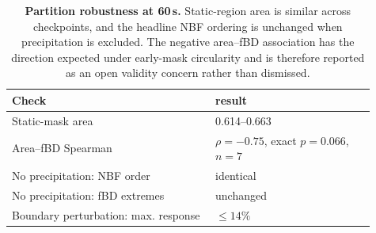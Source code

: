 \begin{table}[tb]
\centering
\scriptsize
\setlength{\tabcolsep}{4pt}
\begin{tabular}{p{0.51\linewidth} p{0.40\linewidth}}
\toprule
Check & result \\
\midrule
Static-mask area & 0.614--0.663 \\
Area--fBD Spearman & $\rho=-0.75$, exact $p=0.066$, $n=7$ \\
No precipitation: NBF order & identical \\
No precipitation: fBD extremes & unchanged \\
Boundary perturbation: max. response & $\leq 14\%$ \\
\bottomrule
\end{tabular}
\caption{\textbf{Partition robustness at 60\,s.} Static-region area is similar across checkpoints, and the headline NBF ordering is unchanged when precipitation is excluded. The negative area--fBD association has the direction expected under early-mask circularity and is therefore reported as an open validity concern rather than dismissed.}
\label{tab:robustness_main}
\end{table}